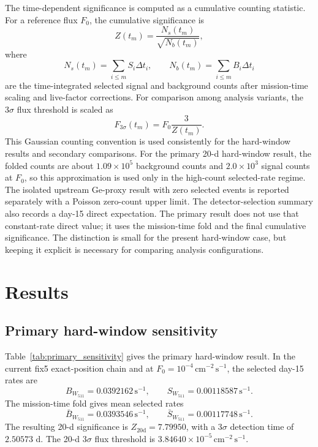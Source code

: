 \documentclass[preprint,12pt]{elsarticle}
\newcommand{\cms}{\,\mathrm{cm^{-2}\,s^{-1}}}
\newcommand{\cps}{\,\mathrm{s^{-1}}}
\newcommand{\wii}{W_{511}}
\newcommand{\fzero}{F_{0}}
\newcommand{\fthree}{F_{3\sigma}}
\begin{document}
The time-dependent significance is computed as a cumulative counting statistic. For a reference flux $\fzero$, the cumulative significance is
\begin{equation}
  Z(t_m) = \frac{N_s(t_m)}{\sqrt{N_b(t_m)}},
\end{equation}
where
\begin{equation}
  N_s(t_m)=\sum_{i\leq m}S_i\Delta t_i,\qquad
  N_b(t_m)=\sum_{i\leq m}B_i\Delta t_i
\end{equation}
are the time-integrated selected signal and background counts after
mission-time scaling and live-factor corrections. For comparison among
analysis variants, the $3\sigma$ flux threshold is scaled as
\begin{equation}
  \fthree(t_m) = \fzero \frac{3}{Z(t_m)}.
\end{equation}
This Gaussian counting convention is used consistently for the hard-window results and secondary comparisons.
For the primary 20-d hard-window result, the folded counts are about
$1.09\times10^5$ background counts and $2.0\times10^3$ signal counts at
$\fzero$, so this approximation is used only in the high-count selected-rate
regime. The isolated upstream Ge-proxy result with zero selected events is
reported separately with a Poisson zero-count upper limit.
The detector-selection summary also records a day-15 direct expectation. The primary
result does not use that constant-rate direct value; it uses the
mission-time fold and the final cumulative significance. The distinction is
small for the present hard-window case, but keeping it explicit is necessary
for comparing analysis configurations.

\section{Results}
\label{sec:results}

\subsection{Primary hard-window sensitivity}
\label{subsec:primary}

Table~\ref{tab:primary_sensitivity} gives the primary hard-window result. In the current fix5 exact-position chain and at $\fzero=10^{-4}\cms$, the selected day-15 rates are
\begin{equation}
  B_{\wii}=0.0392162\cps,\qquad
  S_{\wii}=0.00118587\cps .
\end{equation}
The mission-time fold gives mean selected rates
\begin{equation}
  \bar{B}_{\wii}=0.0393546\cps,\qquad
  \bar{S}_{\wii}=0.00117748\cps .
\end{equation}
The resulting 20-d significance is $Z_{20\mathrm{d}}=7.79950$, with a $3\sigma$ detection time of $2.50573$ d. The 20-d $3\sigma$ flux threshold is $3.84640\times10^{-5}\cms$.
\end{document}
